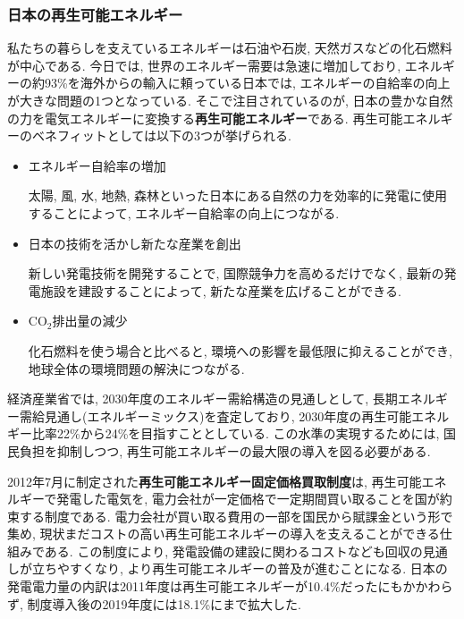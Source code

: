 \documentclass[dvipdfmx]{jsarticle}
\begin{document}
\subsubsection{日本の再生可能エネルギー}
私たちの暮らしを支えているエネルギーは石油や石炭, 天然ガスなどの化石燃料が中心である.
今日では, 世界のエネルギー需要は急速に増加しており, エネルギーの約93\%を海外からの輸入に頼っている日本では, エネルギーの自給率の向上が大きな問題の1つとなっている.
そこで注目されているのが, 日本の豊かな自然の力を電気エネルギーに変換する\textbf{再生可能エネルギー}である.
再生可能エネルギーのベネフィットとしては以下の3つが挙げられる.
\begin{itemize}
    \item エネルギー自給率の増加

    太陽, 風, 水, 地熱, 森林といった日本にある自然の力を効率的に発電に使用することによって, エネルギー自給率の向上につながる.

    \item 日本の技術を活かし新たな産業を創出

    新しい発電技術を開発することで, 国際競争力を高めるだけでなく, 最新の発電施設を建設することによって, 新たな産業を広げることができる.

    \item CO$_{2}$排出量の減少

    化石燃料を使う場合と比べると, 環境への影響を最低限に抑えることができ, 地球全体の環境問題の解決につながる.

\end{itemize}

経済産業省では, 2030年度のエネルギー需給構造の見通しとして, 長期エネルギー需給見通し(エネルギーミックス)を査定しており, 2030年度の再生可能エネルギー比率22\%から24\%を目指すこととしている.
この水準の実現するためには, 国民負担を抑制しつつ, 再生可能エネルギーの最大限の導入を図る必要がある.

2012年7月に制定された\textbf{再生可能エネルギー固定価格買取制度}は, 再生可能エネルギーで発電した電気を, 電力会社が一定価格で一定期間買い取ることを国が約束する制度である.
電力会社が買い取る費用の一部を国民から賦課金という形で集め, 現状まだコストの高い再生可能エネルギーの導入を支えることができる仕組みである.
この制度により, 発電設備の建設に関わるコストなども回収の見通しが立ちやすくなり, より再生可能エネルギーの普及が進むことになる.
日本の発電電力量の内訳は2011年度は再生可能エネルギーが10.4\%だったにもかかわらず, 制度導入後の2019年度には18.1\%にまで拡大した.
\end{document}
